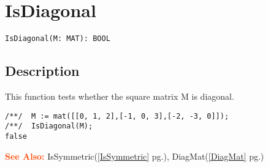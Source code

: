 \documentclass[a4paper]{mybook}
\newenvironment{command}{}{} %
\newcommand\SeeAlso{\par\textcolor{OrangeRed}{\textbf{\large See Also: }}}
\begin{document}
\section{IsDiagonal}
\label{IsDiagonal}
\begin{command} %


\begin{Verbatim}[label=syntax, rulecolor=\color{MidnightBlue},
frame=single]
IsDiagonal(M: MAT): BOOL
\end{Verbatim}


\subsection*{Description}

This function tests whether the square matrix M is diagonal.
\begin{Verbatim}[label=example, rulecolor=\color{PineGreen}, frame=single]
/**/  M := mat([[0, 1, 2],[-1, 0, 3],[-2, -3, 0]]);
/**/  IsDiagonal(M);
false
\end{Verbatim}


\SeeAlso %
  IsSymmetric(\ref{IsSymmetric} pg.\pageref{IsSymmetric}), 
    DiagMat(\ref{DiagMat} pg.\pageref{DiagMat})
\end{command} %
\end{document}
